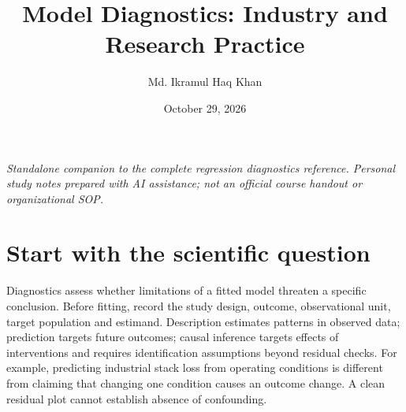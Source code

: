 \documentclass[11pt]{article}
\title{Model Diagnostics: Industry and Research Practice}
\author{Md. Ikramul Haq Khan}
\date{October 29, 2026}
\begin{document}
\maketitle
\textit{Standalone companion to the complete regression diagnostics reference. Personal study notes prepared with AI assistance; not an official course handout or organizational SOP.}
\section{Start with the scientific question}
Diagnostics assess whether limitations of a fitted model threaten a specific conclusion. Before fitting, record the study design, outcome, observational unit, target population and estimand. Description estimates patterns in observed data; prediction targets future outcomes; causal inference targets effects of interventions and requires identification assumptions beyond residual checks.
For example, predicting industrial stack loss from operating conditions is different from claiming that changing one condition causes an outcome change. A clean residual plot cannot establish absence of confounding.
\end{document}
